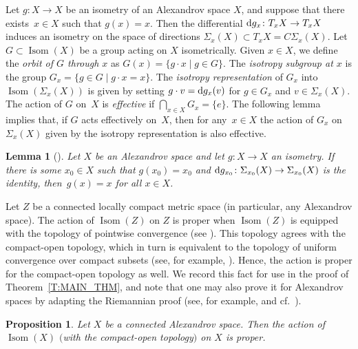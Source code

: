 \documentclass[10pt,a4paper]{amsart}
\numberwithin{equation}{section}
\newtheorem{lem}[thm]{Lemma}
\newtheorem{prop}[thm]{Proposition}
\theoremstyle{definition}
\DeclareMathOperator{\Iso}{Isom}
\begin{document}
Let $g\colon X\to X$ be an isometry of an Alexandrov space $X$, and suppose that there exists~${x\in X}$ such that $g(x) = x$. Then the differential ${\rm d}g_x\colon T_x X\to T_x X$ induces an isometry on the space of directions $\Sigma_x(X)\subset T_xX = C\Sigma_x(X)$. Let $G\subset \Iso(X)$ be a group acting on $X$ isometrically. Given $x\in X$, we define the \emph{orbit of $G$ through $x$} as $G(x) = \{g\cdot x\mid g\in G\}$. The \emph{isotropy subgroup at $x$} is the group $G_x = \{g\in G\mid g\cdot x = x\}$. The \emph{isotropy representation} of $G_x$ into $\Iso(\Sigma_x(X))$ is given by setting $g\cdot v = {\rm d} g_x(v)$ for $g\in G_x$ and $v\in \Sigma_x(X)$.
The action of $G$ on~$X$ is \emph{effective} if $\bigcap_{x\in X} G_x = \{e\}$. The following lemma implies that, if $G$ acts effectively on~$X$, then for any~${x\in X}$ the action of $G_x$ on $\Sigma_x(X)$ given by the isotropy representation is also effective.

\begin{lem}[]
\label{L: Isotropy action acts effectivelly}
Let $X$ be an Alexandrov space and let $g\colon X\to X$ an isometry. If there is some $x_0\in X$ such that $g(x_0)=x_0$ and ${\rm d}g_{x_0}\colon \Sigma_{x_0}(X)\to \Sigma_{x_0}(X)$ is the identity, then~${g(x)=x}$ for all $x\in X$.
\end{lem}

Let $Z$ be a connected locally compact metric space (in particular, any Alexandrov space).
The action of $\Iso(Z)$ on $Z$ is proper when $\Iso(Z)$ is equipped with the topology of pointwise convergence (see \cite[Proposition in Section 4, p.\ 11]{ManoussosStrantzalos2003}).
This topology agrees with the compact-open topology, which in turn is equivalent to the topology of uniform convergence over compact subsets (see, for example, \cite{Manoussos2010}).
Hence, the action is proper for the compact-open topology as well.
We record this fact for use in the proof of Theorem~\ref{T:MAIN_THM}, and note that one may also prove it for Alexandrov spaces by adapting the Riemannian proof (see, for example, \cite[Proposition~3.62]{AlexandrinoBettiol2015} and cf.\ \cite{DiazRamos2008a}).

\begin{prop}\label{P: Isometry group of Alex space acts properly}
Let $X$ be a connected Alexandrov space. Then the action of $\Iso(X)$ $($with the compact-open topology$)$ on $X$ is proper.
\end{prop}
\end{document}

